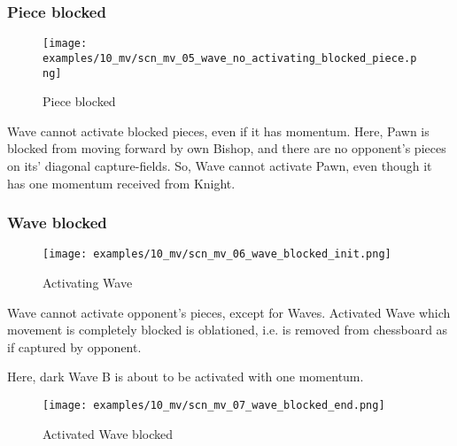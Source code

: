 \clearpage %

\subsubsection*{Piece blocked}

\vspace*{-3.0ex}
\noindent
\begin{figure}[h]
\texttt{[image: examples/10\_mv/scn\_mv\_05\_wave\_no\_activating\_blocked\_piece.png]}
\caption{Piece blocked}
\label{fig:scn_mv_05_wave_no_activating_blocked_piece}
\end{figure}

Wave cannot activate blocked pieces, even if it has momentum. Here, Pawn is blocked
from moving forward by own Bishop, and there are no opponent's pieces on its'
diagonal capture-fields. So, Wave cannot activate Pawn, even though it has one
momentum received from Knight.

\clearpage %

\subsubsection*{Wave blocked}

\vspace*{-3.0ex}
\noindent
\begin{figure}[h]
\texttt{[image: examples/10\_mv/scn\_mv\_06\_wave\_blocked\_init.png]}
\caption{Activating Wave}
\label{fig:scn_mv_06_wave_blocked_init}
\end{figure}

Wave cannot activate opponent's pieces, except for Waves. Activated Wave which movement
is completely blocked is oblationed, i.e. is removed from chessboard as if captured by
opponent.

Here, dark Wave B is about to be activated with one momentum.

\clearpage %

\vspace*{-5.0ex}
\noindent
\begin{figure}[h]
\texttt{[image: examples/10\_mv/scn\_mv\_07\_wave\_blocked\_end.png]}
\caption{Activated Wave blocked}
\label{fig:scn_mv_07_wave_blocked_end}
\end{figure}

